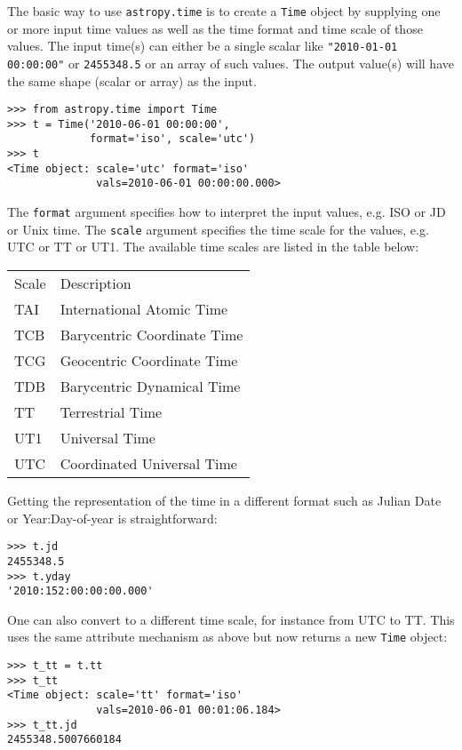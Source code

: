 \documentclass[traditabstract]{aa}
\begin{document}
The basic way to use \texttt{astropy.time} is to create a \texttt{Time} object
by supplying one or more input time values as well as the time format and time
scale of those values.  The input time(s) can either be a single scalar like
\verb|"2010-01-01 00:00:00"| or \verb|2455348.5| or an array of such values.
The output value(s) will have the same shape (scalar or array) as the input.

\begin{verbatim}
>>> from astropy.time import Time
>>> t = Time('2010-06-01 00:00:00',
             format='iso', scale='utc')
>>> t
<Time object: scale='utc' format='iso'
              vals=2010-06-01 00:00:00.000>

\end{verbatim}

The \texttt{format} argument specifies how to interpret the input values, e.g. ISO
or JD or Unix time.  The \texttt{scale} argument specifies the time scale for the
values, e.g. UTC or TT or UT1.  The available time scales are listed in the
table below:

\begin{center}
\begin{tabular}{ll}
Scale  & Description \\
TAI    & International Atomic Time \\
TCB    & Barycentric Coordinate Time \\
TCG    & Geocentric Coordinate Time \\
TDB    & Barycentric Dynamical Time \\
TT     & Terrestrial Time \\
UT1    & Universal Time \\
UTC    & Coordinated Universal Time \\
\end{tabular}
\end{center}

Getting the representation of the time in a different format such as Julian
Date or Year:Day-of-year is straightforward:

\begin{verbatim}
>>> t.jd
2455348.5
>>> t.yday
'2010:152:00:00:00.000'
\end{verbatim}

One can also convert to a different time scale, for instance from UTC to
TT.  This uses the same attribute mechanism as above but now returns a new
\texttt{Time} object:

\begin{verbatim}
>>> t_tt = t.tt
>>> t_tt
<Time object: scale='tt' format='iso'
              vals=2010-06-01 00:01:06.184>
>>> t_tt.jd
2455348.5007660184
\end{verbatim}
\end{document}
